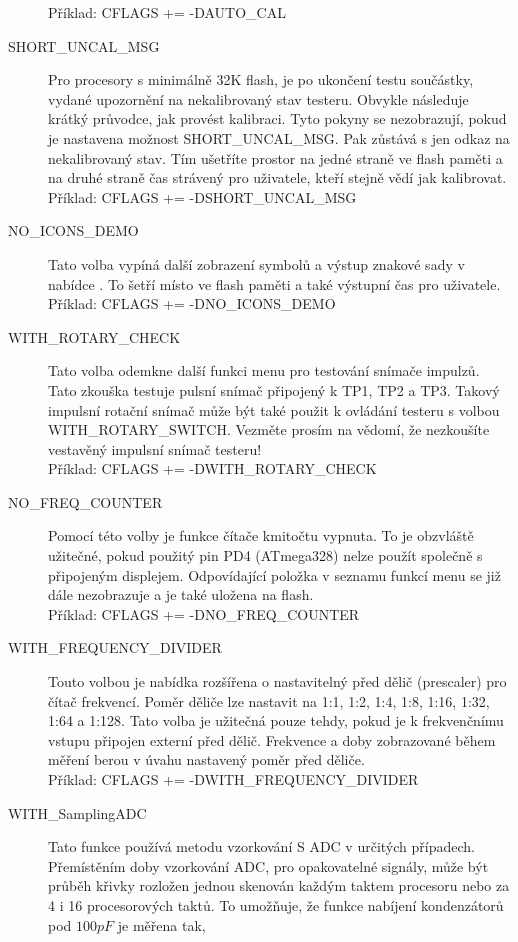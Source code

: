\begin{description}
Příklad: CFLAGS += -DAUTO\_CAL
  \item[SHORT\_UNCAL\_MSG] Pro procesory s minimálně 32K flash, je po ukončení testu součástky, vydané
upozornění na nekalibrovaný stav testeru.
Obvykle následuje krátký průvodce, jak provést kalibraci.
Tyto pokyny se nezobrazují, pokud je nastavena možnost SHORT\_UNCAL\_MSG.
Pak zůstává s jen odkaz na nekalibrovaný stav.
Tím ušetříte prostor na jedné straně ve flash paměti a na druhé straně čas strávený pro uživatele,
kteří stejně vědí jak kalibrovat.\\
Příklad: CFLAGS += -DSHORT\_UNCAL\_MSG
 \item[NO\_ICONS\_DEMO]
Tato volba vypíná další zobrazení symbolů a výstup znakové sady v nabídce
.
To šetří místo ve flash paměti a také výstupní čas pro uživatele.\\
Příklad: CFLAGS += -DNO\_ICONS\_DEMO
 \item[WITH\_ROTARY\_CHECK]
Tato volba odemkne další funkci menu pro testování snímače impulzů.
Tato zkouška testuje pulsní snímač připojený k TP1, TP2 a TP3.
Takový impulsní rotační snímač může být také použit k ovládání testeru s volbou WITH\_ROTARY\_SWITCH.
Vezměte prosím na vědomí, že nezkoušíte vestavěný impulsní snímač testeru!\\
Příklad: CFLAGS += -DWITH\_ROTARY\_CHECK
 \item[NO\_FREQ\_COUNTER]
Pomocí této volby je funkce čítače kmitočtu vypnuta.
To je obzvláště užitečné, pokud použitý pin PD4 (ATmega328) nelze použít společně s
připojeným displejem.
Odpovídající položka v seznamu funkcí menu se již dále nezobrazuje a je také uložena na flash.\\
Příklad: CFLAGS += -DNO\_FREQ\_COUNTER
 \item[WITH\_FREQUENCY\_DIVIDER]
Touto volbou je nabídka rozšířena o nastavitelný před dělič (prescaler) pro čítač frekvencí.
Poměr děliče lze nastavit na 1:1, 1:2, 1:4, 1:8, 1:16, 1:32, 1:64 a 1:128.
Tato volba je užitečná pouze tehdy, pokud je k frekvenčnímu vstupu připojen externí před dělič.
Frekvence a doby zobrazované během měření berou v úvahu nastavený poměr před děliče.\\
Příklad: CFLAGS += -DWITH\_FREQUENCY\_DIVIDER
  \item[WITH\_SamplingADC] Tato funkce používá metodu vzorkování S ADC v určitých případech.
Přemístěním doby vzorkování ADC, pro opakovatelné signály, může být průběh křivky rozložen jednou
skenován každým taktem procesoru nebo za 4 i 16 procesorových taktů.
To umožňuje, že funkce nabíjení kondenzátorů pod \(100pF\) je měřena tak,

\end{description}
